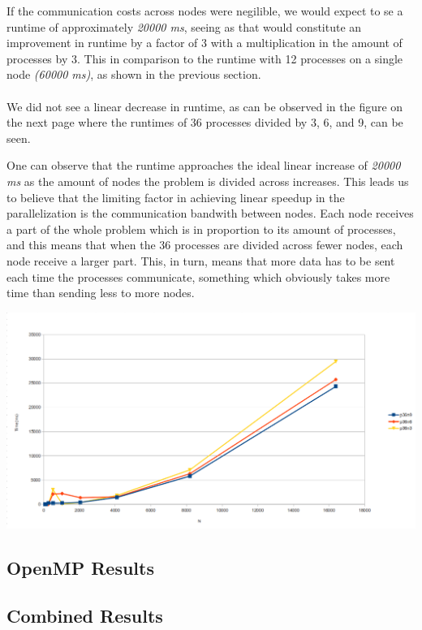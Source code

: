 \documentclass[fontsize=11pt,paper=a4,titlepage]{article}
\begin{document}
If the communication costs across nodes were negilible, we would expect to se a runtime of approximately \emph{20000 ms}, seeing as that would constitute an improvement in runtime by a factor of 3 with a multiplication in the amount of processes by 3. This in comparison to the runtime with 12 processes on a single node \emph{(60000 ms)}, as shown in the previous section.
\\\\
We did not see a linear decrease in runtime, as can be observed in the figure on the next page where the runtimes of 36 processes divided by 3, 6, and 9, can be seen.

One can observe that the runtime approaches the ideal linear increase of \emph{20000 ms} as the amount of nodes the problem is divided across increases. This leads us to believe that the limiting factor in achieving linear speedup in the parallelization is the communication bandwith between nodes.
Each node receives a part of the whole problem which is in proportion to its amount of processes, and this means that when the 36 processes are divided across fewer nodes, each node receive a larger part. This, in turn, means that more data has to be sent each time the processes communicate, something which obviously takes more time than sending less to more nodes. 


\includegraphics[scale=0.5]{pics/p36nX.png}

\subsection{OpenMP Results}

\subsection{Combined Results}
\end{document}
